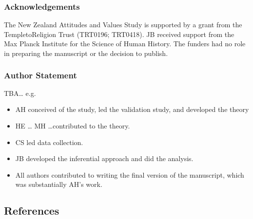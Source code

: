 \documentclass[
  single column]{article}
\providecommand{\tightlist}{%
  \setlength{\itemsep}{0pt}\setlength{\parskip}{0pt}}\usepackage{longtable,booktabs,array}
\begin{document}
\subsubsection{Acknowledgements}\label{acknowledgements}

The New Zealand Attitudes and Values Study is supported by a grant from
the TempletoReligion Trust (TRT0196; TRT0418). JB received support from
the Max Planck Institute for the Science of Human History. The funders
had no role in preparing the manuscript or the decision to publish.

\subsubsection{Author Statement}\label{author-statement}

TBA\ldots{} e.g.~

\begin{itemize}
\tightlist
\item
  AH conceived of the study, led the validation study, and developed the
  theory
\item
  HE \ldots{} MH \ldots contributed to the theory.
\item
  CS led data collection.
\item
  JB developed the inferential approach and did the analysis.\\
\item
  All authors contributed to writing the final version of the
  manuscript, which was substantially AH's work.
\end{itemize}

\newpage{}

\subsection{References}\label{references}
\end{document}
